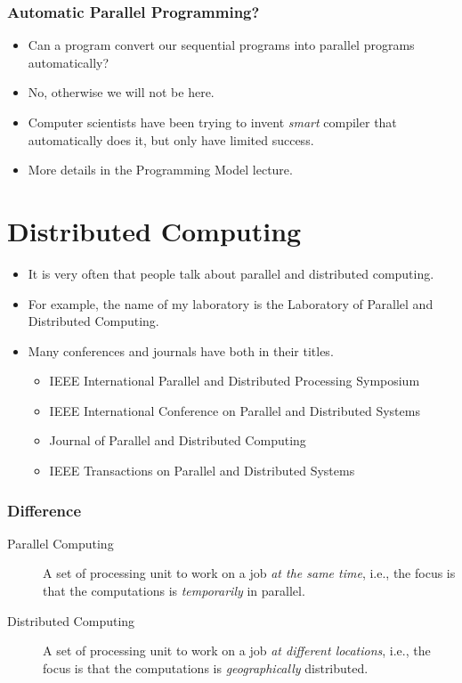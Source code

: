 \documentclass{beamer}
\begin{document}
\begin{CJK}{UTF8}{bsmi}
\begin{frame}
\frametitle{Automatic Parallel Programming?} 
\begin{itemize}
\item Can a program convert our sequential programs into parallel
  programs automatically?
\item No, otherwise we will not be here.
\item Computer scientists have been trying to invent {\em smart} compiler that automatically does it, but only have limited success.
\item More details in the Programming Model lecture.
\end{itemize}
\end{frame}

\section{Distributed Computing}

\begin{frame}
\begin{itemize}
\item It is very often that people talk about parallel and distributed
  computing.
\item For example, the name of my laboratory is the Laboratory of Parallel and Distributed Computing.
\item Many conferences and journals have both in their titles.
\begin{itemize}
\item IEEE International Parallel and Distributed Processing Symposium
\item IEEE International Conference on Parallel and Distributed Systems
\item Journal of Parallel and Distributed Computing
\item IEEE Transactions on Parallel and Distributed Systems
\end{itemize}
\end{itemize}
\end{frame}

\begin{frame}
\frametitle{Difference}
\begin{description}
\item[Parallel Computing] A set of processing unit to work on a job
  {\em at the same time}, i.e., the focus is that the computations is
  {\em temporarily} in parallel.
\item[Distributed Computing] A set of processing unit to work on a job
  {\em at different locations}, i.e., the focus is that the
  computations is {\em geographically} distributed.
\end{description}
\end{frame}


\end{CJK}
\end{document}
